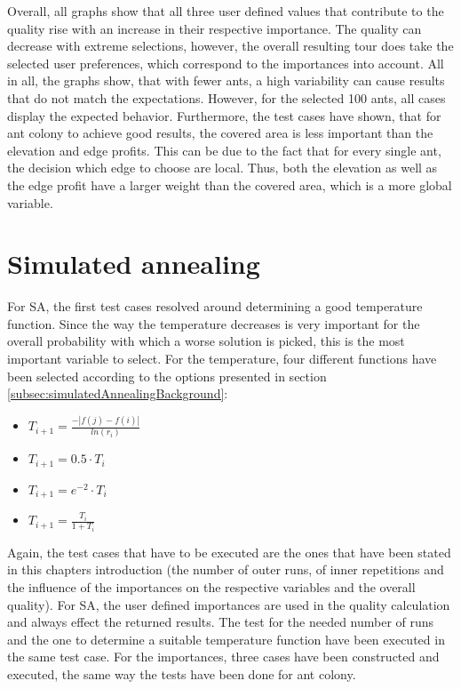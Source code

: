 Overall, all graphs show that all three user defined values that contribute to the quality rise with an increase in their respective importance.
The quality can decrease with extreme selections, however, the overall resulting tour does take the selected user preferences, which correspond to the importances into account.
All in all, the graphs show, that with fewer ants, a high variability can cause results that do not match the expectations.
However, for the selected 100 ants, all cases display the expected behavior.
Furthermore, the test cases have shown, that for ant colony to achieve good results, the covered area is less important than the elevation and edge profits.
This can be due to the fact that for every single ant, the decision which edge to choose are local.
Thus, both the elevation as well as the edge profit have a larger weight than the covered area, which is a more global variable.


\section{Simulated annealing}


For SA, the first test cases resolved around determining a good temperature function. 
Since the way the temperature decreases is very important for the overall probability with which a worse solution is picked, this is the most important variable to select.
For the temperature, four different functions have been selected according to the options presented in section \ref{subsec:simulatedAnnealingBackground}:
\begin{itemize}
	\item $	T_{i+1} = \frac{- |f(j)-f(i)|}{ln(r_i)}	$
	\item $T_{i+1} = 0.5 \cdot T_i$
	\item $T_{i+1} = e^{-2} \cdot T_i$
	\item $T_{i+1} = \frac{T_i}{1 + T_i}$
\end{itemize}

Again, the test cases that have to be executed are the ones that have been stated in this chapters introduction (the number of outer runs, of inner repetitions and the influence of the importances on the respective variables and the overall quality).
For SA, the user defined importances are used in the quality calculation and always effect the returned results.
The test for the needed number of runs and the one to determine a suitable temperature function have been executed in the same test case.
For the importances, three cases have been constructed and executed, the same way the tests have been done for ant colony.



